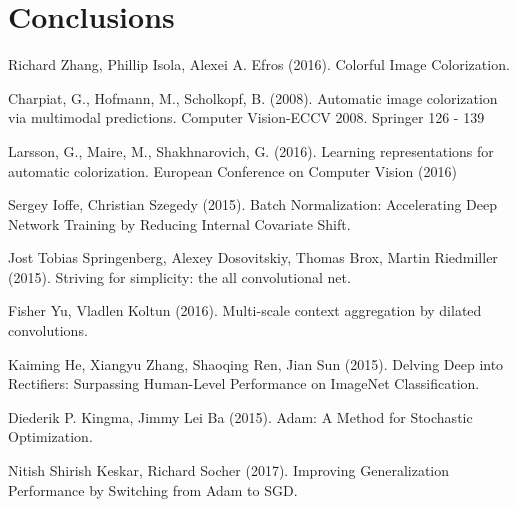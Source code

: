 \documentclass[twoside,twocolumn]{article}
\begin{document}

\newpage

\section{Conclusions}



\newpage

\begin{thebibliography}{99} %

Richard Zhang, Phillip Isola, Alexei A. Efros (2016).
\newblock Colorful Image Colorization.
 
Charpiat, G., Hofmann, M., Scholkopf, B. (2008).
\newblock Automatic image colorization via multimodal
predictions.
\newblock Computer Vision-ECCV 2008. Springer 126 - 139

Larsson, G., Maire, M., Shakhnarovich, G. (2016).
\newblock Learning representations for automatic
colorization.
\newblock European Conference on Computer Vision (2016)

Sergey Ioffe, Christian Szegedy (2015).
\newblock Batch Normalization: Accelerating Deep Network Training by Reducing Internal Covariate Shift.

Jost Tobias Springenberg, Alexey Dosovitskiy, Thomas Brox, Martin Riedmiller (2015).
\newblock Striving for simplicity: the all convolutional net.

Fisher Yu, Vladlen Koltun (2016).
\newblock Multi-scale context aggregation by dilated convolutions.

Kaiming He, Xiangyu Zhang, Shaoqing Ren, Jian Sun (2015).
\newblock Delving Deep into Rectifiers: Surpassing Human-Level Performance on ImageNet Classification.

Diederik P. Kingma, Jimmy Lei Ba (2015).
\newblock Adam: A Method for Stochastic Optimization.

Nitish Shirish Keskar, Richard Socher (2017).
\newblock Improving Generalization Performance by Switching from Adam to SGD.


\end{thebibliography}
\end{document}

